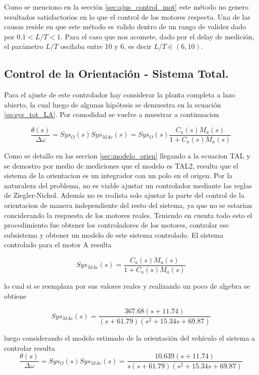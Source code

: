 \documentclass[10pt,conference,a4paper,onecolumn]{article}%
\begin{document}
Como se menciono en la sección \ref{sec:ajus_control_mot} este método no genero resultados satisfactorios en lo que el control de los motores respecta. Una de las causas reside en que este método es valido dentro de un rango de validez \cite[pág. 60]{biblia_PID} dado por $0.1<L/T<1$. Para el caso que nos acomete, dado por el delay de medición, el parámetro $L/T$ oscilaba entre 10 y 6, es decir $L/T \in (6,10) $. 
\subsection{Control de la Orientación - Sistema Total.}

Para el ajuste de este controlador hay considerar la planta completa a lazo abierto, la cual luego de algunas hipótesis se demuestra en la ecuación \ref{eq:sys_tot_LA}. Por comodidad se vuelve a  muestrar a continuacion

\begin{equation*}
\frac{\theta(s)}{\Delta \omega}=Sys_O(s)Sys_{MAc}(s)=Sys_O(s)\frac{C_a(s)M_a(s)}{1+C_a(s)M_a(s)}
\end{equation*}

Como se detallo en las seccion \ref{sec:modelo_orien} llegando a la ecuacion TAL y se demostro por medio de mediciones que el modelo es TAL2, resulta que el sistema de la orientacion es un integrador con un polo en el origen. Por la naturaleza del problema, no es viable ajustar un controlador mediante las reglas de Ziegler-Nichol. Además no es realista solo ajustar la parte del control de la orientacion de manera independiente del resto del sistema, ya que no se estarian conciderando la respuesta de los motores reales. Teniendo en cuenta todo esto el procedimiento fue obtener los controladores de los motores, controlar ese subsistema y obtener un modelo de este sistema controlado. El sistema controlado para el motor A resulta

\begin{equation}
Sys_{MAc}(s)=\frac{C_a(s)M_a(s)}{1+C_a(s)M_a(s)}
\end{equation}    

lo cual si se reemplaza por sus valores reales y realizando un poco de algebra se obtiene

\begin{equation}
Sys_{MAc}(s)=\frac{367.68(s+11.74)}{(s+61.79) (s^2 + 15.34s + 69.87)}
\end{equation}

luego considerando el modelo estimado de la orientación del vehículo el sistema a controlar resulta
\begin{equation}
\frac{\theta(s)}{\Delta \omega}=Sys_O(s)Sys_{MAc}(s)=\frac{10.639 (s+11.74)}{s (s+61.79) (s^2 + 15.34s + 69.87)}
\end{equation}
\end{document}
